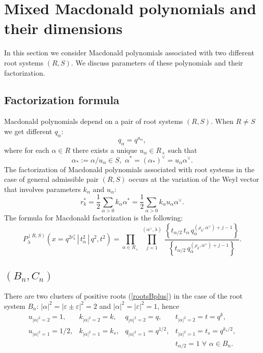 \documentclass{article}
\begin{document}
\section{Mixed Macdonald polynomials and their dimensions \label{MixedMacSec}}
In this section we consider Macdonald polynomials associated with two different root systems $(R,S)$. We discuss parameters of these polynomials and their factorization.

\subsection{Factorization formula}
Macdonald polynomials depend on a pair of root systems $(R,S)$. When $R\neq S$ we get different $q_{\alpha}$:
\begin{equation}
    q_{\alpha} = q^{u_{\alpha}},
\end{equation}
where for each $\alpha \in R$ there exists a unique $u_\alpha \in R_+$ such that
\begin{equation}
    \alpha_{*}:=\alpha/u_{\alpha} \in S, \,\, \alpha^* = (\alpha_*)^{\vee} = u_{\alpha} \alpha^{\vee}.
\end{equation}
The factorization of Macdonald polynomials associated with root systems in the case of general admissible pair $(R,S)$ occurs at the variation of the Weyl vector that involves parameters $k_{\alpha}$ and $u_{\alpha}$:
\begin{equation}
 r_k^{*} = \frac{1}{2} \sum_{\alpha > 0} k_{\alpha} \alpha^{*} = \frac{1}{2} \sum_{\alpha > 0} k_{\alpha} u_{\alpha} \alpha^{\vee}.
\end{equation}
The formula for Macdonald factorization is the following:
\begin{equation}
   P^{(R,S)}_{\lambda}\left(x = q^{2r^*_k}\,|\, t_{\alpha}^2\,|\, q^2, t^2 \right) =  \prod_{\alpha \in R_+} \, \prod_{j=1}^{(\alpha^{\vee},\lambda)}\,  \frac{\left\{t_{\alpha/2}\, t_{\alpha}\, q_{\alpha}^{(\rho_k,\alpha^{\vee})+j-1}\right\}}{\left\{t_{\alpha/2}\, q_{\alpha}^{(\rho_k,\alpha^{\vee})+j-1}\right\}}.
\end{equation}

\subsection{$(B_n,C_n)$}

There are two clusters of positive roots (\ref{rootsBplus}) in the case of the root system $B_n$: $|\alpha|^2=| \varepsilon \pm \varepsilon|^2 = 2$ and $|\alpha|^2= |\varepsilon|^2 = 1$, hence
\begin{equation}
    \begin{array}{llll}
   u_{|\alpha|^2 = 2} = 1, & k_{|\alpha|^2 = 2} = k, &    q_{|\alpha|^2 = 2} = q, & t_{|\alpha|^2 = 2} =t= q^{k},  \\
      u_{|\alpha|^2 = 1} = 1/2, & k_{|\alpha|^2 = 1} = k_s, &    q_{|\alpha|^2 = 1} = q^{1/2},&  t_{|\alpha|^2 = 1} = t_s=q^{k_s/2}, \\
      &&& t_{\alpha/2} = 1 \,\, \forall \,\, \alpha \in B_n.
    \end{array}
\end{equation}
\end{document}
